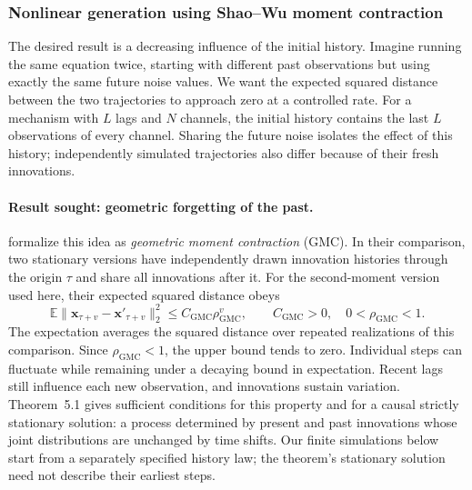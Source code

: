 \subsubsection{Nonlinear generation using Shao--Wu moment contraction}
\label{sec:implemented-shao-wu}

The desired result is a decreasing influence of the initial history. Imagine
running the same equation twice, starting with different past observations but
using exactly the same future noise values. We want the expected squared
distance between the two trajectories to approach zero at a controlled rate.
For a mechanism with $L$ lags and $N$ channels, the initial history contains
the last $L$ observations of every channel. Sharing the future noise isolates
the effect of this history; independently simulated trajectories also differ
because of their fresh innovations.

\paragraph{Result sought: geometric forgetting of the past.}
\label{sec:implemented-shao-wu-theory}

\citet[Section~3, Eq.~(3.1), electronic reprint p.~5]{shao2007spectral}
formalize this idea as \emph{geometric moment contraction} (GMC). In their
comparison, two stationary versions have independently drawn innovation
histories through the origin $\tau$ and share all innovations after it.
For the second-moment version used here, their expected squared distance obeys
\begin{equation}
 \mathbb E\|\mathbf x_{\tau+v}-\mathbf x'_{\tau+v}\|_2^2
 \leq C_{\mathrm{GMC}}\rho_{\mathrm{GMC}}^{v},
 \qquad C_{\mathrm{GMC}}>0,\quad 0<\rho_{\mathrm{GMC}}<1.
 \label{eq:implemented-gmc-forgetting}
\end{equation}
The expectation averages the squared distance over repeated realizations of
this comparison. Since $\rho_{\mathrm{GMC}}<1$, the upper bound tends to zero.
Individual steps can fluctuate while remaining under a decaying bound in
expectation. Recent lags still influence each new observation, and innovations
sustain variation. Theorem~5.1 gives sufficient conditions for this property
and for a causal strictly stationary solution: a process determined by present
and past innovations whose joint distributions are unchanged by time shifts.
Our finite simulations below start from a separately specified history law;
the theorem's stationary solution need not describe their earliest steps.

